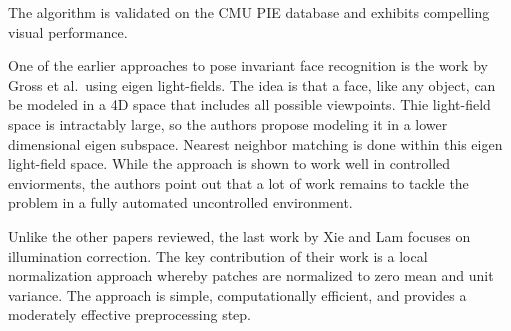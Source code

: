 \documentclass[12pt]{article}
\begin{document}
The algorithm is validated on the CMU PIE database and exhibits compelling visual performance.
\par
One of the earlier approaches to pose invariant face recognition is the work by Gross et al.\ using eigen light-fields.
The idea is that a face, like any object, can be modeled in a 4D space that includes all possible viewpoints.
Thie light-field space is intractably large, so the authors propose modeling it in a lower dimensional eigen subspace.
Nearest neighbor matching is done within this eigen light-field space.
While the approach is shown to work well in controlled enviorments, the authors point out that a lot of work remains to tackle the problem in a fully automated uncontrolled environment.
\par
Unlike the other papers reviewed, the last work by Xie and Lam focuses on illumination correction.
The key contribution of their work is a local normalization approach whereby patches are normalized to zero mean and unit variance. 
The approach is simple, computationally efficient, and provides a moderately effective preprocessing step.
\end{document}

